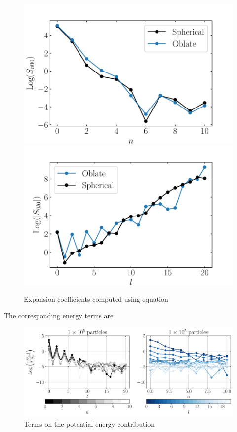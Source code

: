 \documentclass[14pt]{article}
\begin{document}
\begin{figure}[H]
  \centering
  \includegraphics[scale=0.5]{../code/S_n_henrquist_oblate.pdf}
  \includegraphics[scale=0.5]{../code/S_l_henrquist_oblate.pdf}
  \caption{Expansion coefficients computed using equation \label{eq:coefficients}}\label{fig:oblate_coeff}
\end{figure}

The corresponding energy terms are 

\begin{figure}[H]
  \centering
  \includegraphics[scale=0.5]{../code/energy_terms_oblate_hern_a_40_1E5.pdf}
  \caption{Terms on the potential energy contribution}
\end{figure}
\end{document}

